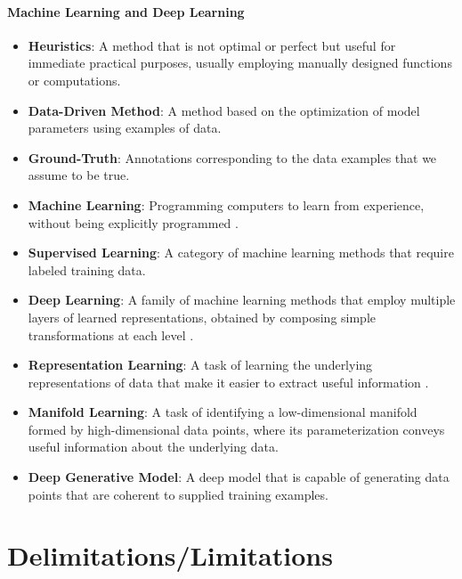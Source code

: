 \paragraph{Machine Learning and Deep Learning}

\begin{itemize}
	\item \textbf{Heuristics}: A method that is not optimal or perfect but useful for immediate practical purposes, usually employing manually designed functions or computations.
	\item \textbf{Data-Driven Method}: A method based on the optimization of model parameters using examples of data.
	\item \textbf{Ground-Truth}: Annotations corresponding to the data examples that we assume to be true.
	\item \textbf{Machine Learning}: Programming computers to learn from experience, without being explicitly programmed \cite{samuel1959ml}.
	\item \textbf{Supervised Learning}: A category of machine learning methods that require labeled training data.
	\item \textbf{Deep Learning}: A family of machine learning methods that employ multiple layers of learned representations, obtained by composing simple transformations at each level \cite{lecun2015deeplearning}.
	\item \textbf{Representation Learning}: A task of learning the underlying representations of data that make it easier to extract useful information \cite{bengio2013representation}.
	\item \textbf{Manifold Learning}: A task of identifying a low-dimensional manifold formed by high-dimensional data points, where its parameterization conveys useful information about the underlying data.
	\item \textbf{Deep Generative Model}: A deep model that is capable of generating data points that are coherent to supplied training examples.
\end{itemize}

\section{Delimitations/Limitations}

